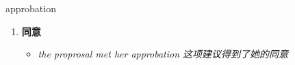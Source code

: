 
\begin{frame}
{\huge approbation}
\begin{center}
\begin{enumerate}\Large
  \item \textbf{同意}
  \begin{itemize}
    \item \em{\Large{the proprosal met her approbation 这项建议得到了她的同意}}
  \end{itemize}
\end{enumerate}
\end{center}
\end{frame}
